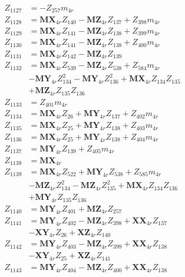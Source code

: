 \begin{multicols}{2}
\begin{align}
Z_{1127} &= -Z_{257}m_{4r} \nonumber \\
Z_{1128} &= \mathbf{MX}_{4r}Z_{140} - \mathbf{MZ}_{4r}Z_{137} + Z_{398}m_{4r} \nonumber \\
Z_{1129} &= \mathbf{MX}_{4r}Z_{141} - \mathbf{MZ}_{4r}Z_{138} + Z_{399}m_{4r} \nonumber \\
Z_{1130} &= \mathbf{MX}_{4r}Z_{141} - \mathbf{MZ}_{4r}Z_{138} + Z_{400}m_{4r} \nonumber \\
Z_{1131} &= \mathbf{MX}_{4r}Z_{142} - \mathbf{MZ}_{4r}Z_{139} \nonumber \\
Z_{1132} &= \mathbf{MX}_{4r}Z_{539} - \mathbf{MZ}_{4r}Z_{538} + Z_{584}m_{4r}  \nonumber \\
&- \mathbf{MY}_{4r}Z_{134}^2 - \mathbf{MY}_{4r}Z_{136}^2 + \mathbf{MX}_{4r}Z_{134}Z_{135}  \nonumber \\
&+ \mathbf{MZ}_{4r}Z_{135}Z_{136} \nonumber \\
Z_{1133} &= Z_{401}m_{4r} \nonumber \\
Z_{1134} &= \mathbf{MX}_{4r}Z_{26} + \mathbf{MY}_{4r}Z_{137} + Z_{402}m_{4r} \nonumber \\
Z_{1135} &= \mathbf{MX}_{4r}Z_{25} + \mathbf{MY}_{4r}Z_{138} + Z_{403}m_{4r} \nonumber \\
Z_{1136} &= \mathbf{MX}_{4r}Z_{25} + \mathbf{MY}_{4r}Z_{138} + Z_{404}m_{4r} \nonumber \\
Z_{1137} &= \mathbf{MY}_{4r}Z_{139} + Z_{405}m_{4r} \nonumber \\
Z_{1138} &= \mathbf{MX}_{4r} \nonumber \\
Z_{1139} &= \mathbf{MX}_{4r}Z_{522} + \mathbf{MY}_{4r}Z_{538} + Z_{585}m_{4r}  \nonumber \\
&- \mathbf{MZ}_{4r}Z_{134}^2 - \mathbf{MZ}_{4r}Z_{135}^2 + \mathbf{MX}_{4r}Z_{134}Z_{136}  \nonumber \\
&+ \mathbf{MY}_{4r}Z_{135}Z_{136} \nonumber \\
Z_{1140} &= \mathbf{MY}_{4r}Z_{401} + \mathbf{MZ}_{4r}Z_{257} \nonumber \\
Z_{1141} &= \mathbf{MY}_{4r}Z_{402} - \mathbf{MZ}_{4r}Z_{398} + \mathbf{XX}_{4r}Z_{137}  \nonumber \\
&- \mathbf{XY}_{4r}Z_{26} + \mathbf{XZ}_{4r}Z_{140} \nonumber \\
Z_{1142} &= \mathbf{MY}_{4r}Z_{403} - \mathbf{MZ}_{4r}Z_{399} + \mathbf{XX}_{4r}Z_{138}  \nonumber \\
&- \mathbf{XY}_{4r}Z_{25} + \mathbf{XZ}_{4r}Z_{141} \nonumber \\
Z_{1143} &= \mathbf{MY}_{4r}Z_{404} - \mathbf{MZ}_{4r}Z_{400} + \mathbf{XX}_{4r}Z_{138}  \nonumber \\

\end{align}
\end{multicols}
